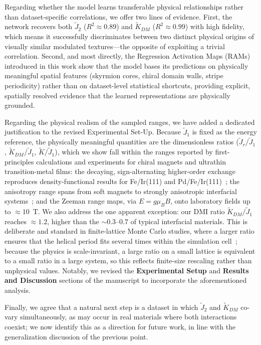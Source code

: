 \documentclass[review,12pt]{report}
\newenvironment{reviewer}{\setcounter{pointcounter}{1}}{}
\begin{document}
\begin{reviewer}
{Regarding whether the model learns transferable physical relationships rather than dataset-specific correlations, we offer two lines of evidence. First, the network recovers both $\tilde{J}_2$ ($R^2 \approx 0.89$) and $\tilde{K}_{DM}$ ($R^2 \approx 0.99$) with high fidelity, which means it successfully discriminates between two distinct physical origins of visually similar modulated textures---the opposite of exploiting a trivial correlation. Second, and most directly, the Regression Activation Maps (RAMs) introduced in this work show that the model bases its predictions on physically meaningful spatial features (skyrmion cores, chiral domain walls, stripe periodicity) rather than on dataset-level statistical shortcuts, providing explicit, spatially resolved evidence that the learned representations are physically grounded.

Regarding the physical realism of the sampled ranges, we have added a dedicated justification to the revised Experimental Set-Up. Because $\tilde{J}_1$ is fixed as the energy reference, the physically meaningful quantities are the dimensionless ratios ($\tilde{J}_r/\tilde{J}_1$, $\tilde{K}_{DM}/\tilde{J}_1$, $\tilde{K}/\tilde{J}_1$), which we show fall within the ranges reported by first-principles calculations and experiments for chiral magnets and ultrathin transition-metal films: the decaying, sign-alternating higher-order exchange reproduces density-functional results for Fe/Ir(111) and Pd/Fe/Ir(111)~\cite{heinze2011spontaneous, dupe2014tailoring}; the anisotropy range spans from soft magnets to strongly anisotropic interfacial systems~\cite{gambardella2003giant, johnson1996magnetic}; and the Zeeman range maps, via $E=g\mu_B B$, onto laboratory fields up to $\approx 10$~T. We also address the one apparent exception: our DMI ratio $\tilde{K}_{DM}/\tilde{J}_1$ reaches $\approx 1.2$, higher than the $\sim0.3$--$0.7$ of typical interfacial materials. This is deliberate and standard in finite-lattice Monte Carlo studies, where a larger ratio ensures that the helical period fits several times within the simulation cell~\cite{buhrandt2013skyrmion}; because the physics is scale-invariant, a large ratio on a small lattice is equivalent to a small ratio in a large system, so this reflects finite-size rescaling rather than unphysical values. Notably, we revised the \textbf{Experimental Setup} and \textbf{Results and Discussion} sections of the manuscript to incorporate the aforementioned analysis.

Finally, we agree that a natural next step is a dataset in which $\tilde{J}_2$ and $\tilde{K}_{DM}$ co-vary simultaneously, as may occur in real materials where both interactions coexist; we now identify this as a direction for future work, in line with the generalization discussion of the previous point.}




\end{reviewer}
\end{document}
